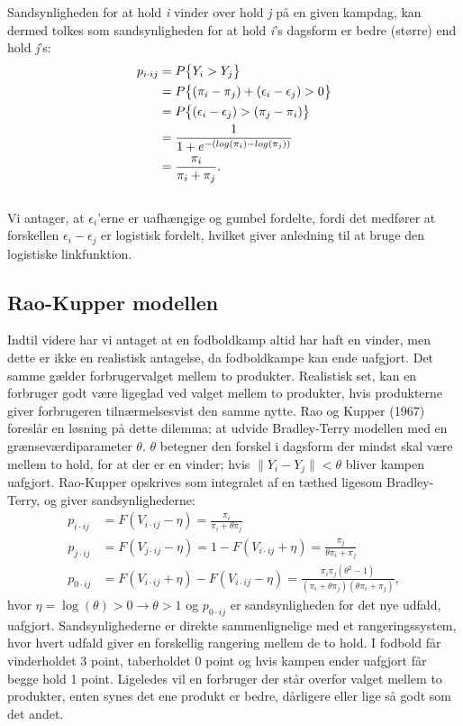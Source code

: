 \documentclass[11pt,a4paper]{article}
\begin{document}
Sandsynligheden for at hold \textit{i} vinder over hold \textit{j} på en given kampdag, kan dermed tolkes som sandsynligheden for at hold \textit{i}'s dagsform er bedre (større) end hold \textit{j}'s:
\begin{align*}
p_{i\cdot ij}&=P\big{\{}Y_i>Y_j\big{\}}
\\&=P\big{\{}(\pi_i-\pi_j)+(\epsilon_i-\epsilon_j)>0\big{\}}
\\&=P\big{\{}(\epsilon_i-\epsilon_j)>(\pi_j-\pi_i)\big{\}}
\\&=\frac{1}{1+e^{-(log(\pi_i)-log(\pi_j))}} 
\\&=\frac{\pi_i}{\pi_i+\pi_j}.\;\;
\end{align*}
\\
Vi antager, at $\epsilon_i$'erne er uafhængige og gumbel fordelte, fordi det medfører at forskellen $\epsilon_i-\epsilon_j$ er logistisk fordelt, hvilket giver anledning til at bruge den logistiske linkfunktion.
\subsection{Rao-Kupper modellen}
Indtil videre har vi antaget at en fodboldkamp altid har haft en vinder, men dette er ikke en realistisk antagelse, da fodboldkampe kan ende uafgjort. Det samme gælder forbrugervalget mellem to produkter. Realistisk set, kan en forbruger godt være ligeglad ved valget mellem to produkter, hvis produkterne giver forbrugeren tilnærmelsesvist den samme nytte. Rao og Kupper (1967) \cite{RaoKupper} foreslår en løsning på dette dilemma; at udvide Bradley-Terry modellen med en grænseværdiparameter $\theta$. $\theta$ betegner den forskel i dagsform der mindst skal være mellem to hold, for at der er en vinder; hvis $\|Y_i-Y_j\| < \theta$ bliver kampen uafgjort. Rao-Kupper opskrives som integralet af en tæthed ligesom Bradley-Terry, og giver sandsynlighederne:
\begin{equation}
\begin{split}
    p_{i\cdot ij}&=F(V_{i\cdot ij}-\eta)=\frac{\pi_i}{\pi_i+\theta \pi_j}\\
    p_{j\cdot ij}&=F(V_{j\cdot ij}-\eta)=1-F(V_{i\cdot ij}+\eta)=\frac{\pi_j}{\theta \pi_i+\pi_j}\\
    p_{0\cdot ij}&=F(V_{i\cdot ij}+\eta)-F(V_{i\cdot ij}-\eta)= \frac{\pi_i \pi_j(\theta^2 -1)}{(\pi_i+\theta \pi_j)(\theta \pi_i + \pi_j)} \label{Sandynligheder},
\end{split}
\end{equation}
hvor $\eta=\log(\theta)>0 \rightarrow\theta>1$ og $p_{0\cdot ij}$ er sandsynligheden for det nye udfald, uafgjort. Sandsynlighederne er direkte sammenlignelige med et rangeringssystem, hvor hvert udfald giver en forskellig rangering mellem de to hold. I fodbold får vinderholdet 3 point, taberholdet 0 point og hvis kampen ender uafgjort får begge hold 1 point. Ligeledes vil en forbruger der står overfor valget mellem to produkter, enten synes det ene produkt er bedre, dårligere eller lige så godt som det andet.
\end{document}
